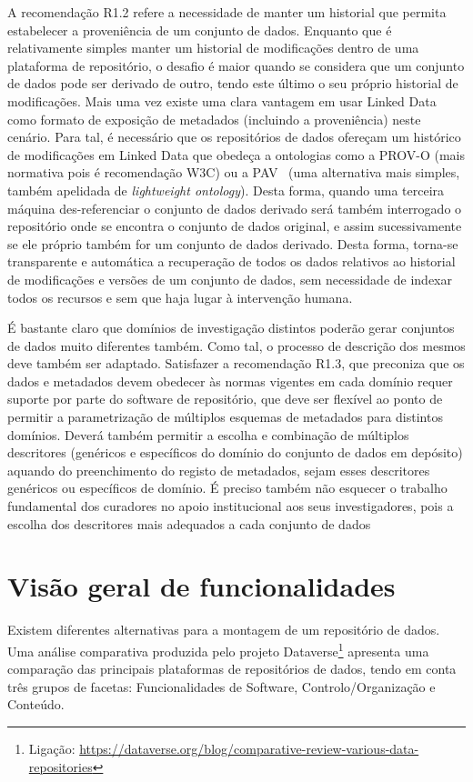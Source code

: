 \documentclass[sigconf,nonacm]{acmart}
\begin{document}
A recomendação R1.2 refere a necessidade de manter um historial que permita estabelecer a proveniência de um conjunto de dados. Enquanto que é relativamente simples manter um historial de modificações dentro de uma plataforma de repositório, o desafio é maior quando se considera que um conjunto de dados pode ser derivado de outro, tendo este último o seu próprio historial de modificações. Mais uma vez existe uma clara vantagem em usar Linked Data como formato de exposição de metadados (incluindo a proveniência) neste cenário. Para tal, é necessário que os repositórios de dados ofereçam um histórico de modificações em Linked Data que obedeça a ontologias como a PROV-O\cite{lebo2013prov} (mais normativa pois é recomendação W3C) ou a PAV~\cite{ciccarese2013pav} (uma alternativa mais simples, também apelidada de \emph{lightweight ontology}). Desta forma, quando uma terceira máquina des-referenciar o conjunto de dados derivado será também interrogado o repositório onde se encontra o conjunto de dados original, e assim sucessivamente se ele próprio também for um conjunto de dados derivado. Desta forma, torna-se transparente e automática a recuperação de todos os dados relativos ao historial de modificações e versões de um conjunto de dados, sem necessidade de indexar todos os recursos e sem que haja lugar à intervenção humana.

É bastante claro que domínios de investigação distintos poderão gerar conjuntos de dados muito diferentes também. Como tal, o processo de descrição dos mesmos deve também ser adaptado. Satisfazer a recomendação R1.3, que preconiza que os dados e metadados devem obedecer às normas vigentes em cada domínio requer suporte por parte do software de repositório, que deve ser flexível ao ponto de permitir a parametrização de múltiplos esquemas de metadados para distintos domínios. Deverá também permitir a escolha e combinação de múltiplos descritores (genéricos e específicos do domínio do conjunto de dados em depósito) aquando do preenchimento do registo de metadados, sejam esses descritores genéricos ou específicos de domínio. É preciso também não esquecer o trabalho fundamental dos curadores no apoio institucional aos seus investigadores, pois a escolha dos descritores mais adequados a cada conjunto de dados

\section{Visão geral de funcionalidades}

Existem diferentes alternativas para a montagem de um repositório de dados. Uma análise comparativa produzida pelo projeto Dataverse\footnote{Ligação:  \url{https://dataverse.org/blog/comparative-review-various-data-repositories}} apresenta uma comparação das principais plataformas de repositórios de dados, tendo em conta três grupos de facetas: Funcionalidades de Software, Controlo/Organização e Conteúdo. 
\end{document}
